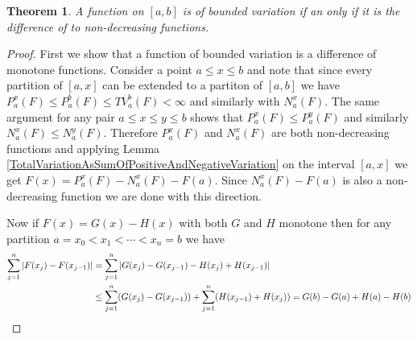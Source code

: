 \documentclass{amsart}
\newtheorem{thm}{Theorem}[section]
\theoremstyle{remark}
\theoremstyle{definition}
\begin{document}
\begin{thm}\label{BoundedVariationAsDifferenceOfMonotone}A function on $[a,b]$ is of bounded variation if an only if
  it is the difference of to non-decreasing functions.
\end{thm}
\begin{proof}
First we show that a function of bounded variation is a difference of
monotone functions.  Consider a point $a \leq x \leq b$ and note that since every partition
of $[a,x]$ can be extended to a partiton of $[a,b]$ we have $P_a^x(F)
\leq P_a^b(F) \leq TV_a^b(F) < \infty$ and similarly with $N_a^x(F)$.
The same argument for any pair $a \leq x \leq y \leq b$ shows that
$P_a^x(F) \leq P_a^y(F)$ and similarly $N_a^x(F) \leq N_a^y(F)$.
Therefore $P_a^x(F)$ and $N_a^x(F)$ are both non-decreasing functions
and applying Lemma
\ref{TotalVariationAsSumOfPositiveAndNegativeVariation} on the
interval $[a,x]$ we get $F(x) = P_a^x(F) - N_a^x(F) - F(a)$.  Since
$N_a^x(F) - F(a)$ is also a non-decreasing function we are done with
this direction.

Now if $F(x) = G(x) - H(x)$ with both $G$ and $H$ monotone then for
any partition $a=x_0 < x_1 < \dotsb < x_n=b$ we have
\begin{align*}
\sum_{j=1}^n \left \vert F(x_j) - F(x_{j-1}) \right \vert &= \sum_{j=1}^n \left \vert G(x_j) -
  G(x_{j-1}) - H(x_j) + H(x_{j-1}) \right \vert \\
&\leq \sum_{j=1}^n (G(x_j) -
  G(x_{j-1})) + \sum_{j=1}^n( H(x_{j-1}) + H(x_{j})) = G(b) - G(a) +
  H(a) - H(b)
\end{align*}
\end{proof}
\end{document}
